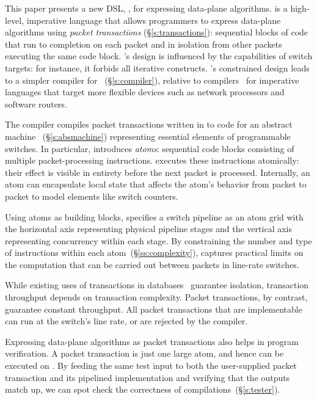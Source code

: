 This paper presents a new DSL, \pktlanguage, for expressing data-plane
algorithms. \pktlanguage is a high-level, imperative language that allows
programmers to express data-plane algorithms using {\em packet transactions}
(\S\ref{s:transactions}): sequential blocks of code that run to completion on
each packet and in isolation from other packets executing the same code block.
\pktlanguage's design is influenced by the capabilities of switch targets: for
instance, it forbids all iterative constructs. \pktlanguage's constrained
design leads to a simpler compiler for \pktlanguage~(\S\ref{s:compiler}),
relative to compilers~\cite{nova, packetc, microenginec} for imperative
languages that target more flexible devices such as network processors and
software routers.

The \pktlanguage compiler compiles packet transactions written in \pktlanguage
to  code for an abstract machine \absmachine~(\S\ref{s:absmachine})
representing essential elements of programmable switches.  In particular,
\absmachine introduces \textit{atoms}: sequential code blocks consisting of
multiple packet-processing instructions. \absmachine executes these
instructions atomically: their effect is visible in entirety before the next
packet is processed. Internally, an atom can encapsulate local state that
affects the atom's behavior from packet to packet to model elements like switch
counters.

Using atoms as building blocks, \absmachine specifies a switch pipeline as an
atom grid with the horizontal axis representing physical pipeline stages and
the vertical axis representing concurrency within each stage.  By constraining
the number and type of instructions within each atom~(\S\ref{ss:complexity}),
\absmachine captures practical limits on the computation that can be carried
out between packets in line-rate switches.

While existing uses of transactions in databases~\cite{db_trans} guarantee
isolation, transaction throughput depends on transaction complexity. Packet
transactions, by contrast, guarantee constant throughput. All packet
transactions that are implementable can run at the switch's line rate, or are
rejected by the compiler.

Expressing data-plane algorithms as packet transactions also helps in program
verification.  A packet transaction is just one large atom, and hence can be
executed on \absmachine.  By feeding the same test input to both the
user-supplied packet transaction and its pipelined implementation and verifying
that the outputs match up, we can spot check the correctness of
compilations~(\S\ref{s:tester}).

